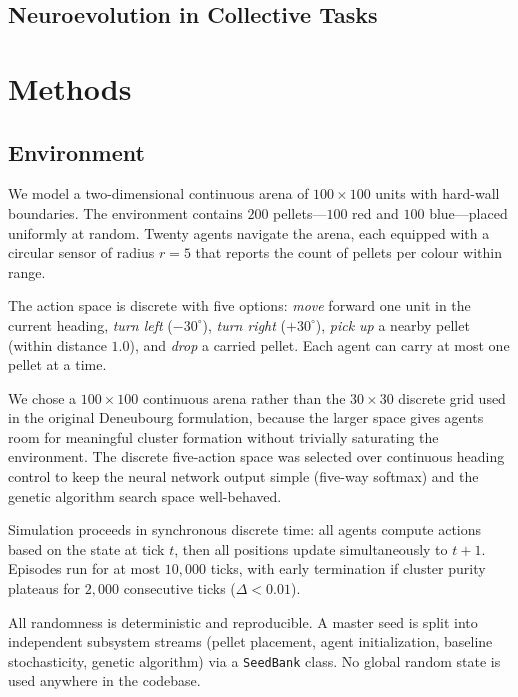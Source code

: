 \documentclass[11pt,a4paper]{article}
\begin{document}
\subsection{Neuroevolution in Collective Tasks}

\section{Methods}
\label{sec:methods}

\subsection{Environment}
\label{sec:methods:environment}

We model a two-dimensional continuous arena of $100 \times 100$ units with hard-wall boundaries. The environment contains $200$ pellets---$100$ red and $100$ blue---placed uniformly at random. Twenty agents navigate the arena, each equipped with a circular sensor of radius $r=5$ that reports the count of pellets per colour within range.

The action space is discrete with five options: \textit{move} forward one unit in the current heading, \textit{turn left} ($-30^\circ$), \textit{turn right} ($+30^\circ$), \textit{pick up} a nearby pellet (within distance $1.0$), and \textit{drop} a carried pellet. Each agent can carry at most one pellet at a time.

We chose a $100 \times 100$ continuous arena rather than the $30 \times 30$ discrete grid used in the original Deneubourg formulation, because the larger space gives agents room for meaningful cluster formation without trivially saturating the environment. The discrete five-action space was selected over continuous heading control to keep the neural network output simple (five-way softmax) and the genetic algorithm search space well-behaved.

Simulation proceeds in synchronous discrete time: all agents compute actions based on the state at tick $t$, then all positions update simultaneously to $t\!+\!1$. Episodes run for at most $10{,}000$ ticks, with early termination if cluster purity plateaus for $2{,}000$ consecutive ticks ($\Delta < 0.01$).

All randomness is deterministic and reproducible. A master seed is split into independent subsystem streams (pellet placement, agent initialization, baseline stochasticity, genetic algorithm) via a \texttt{SeedBank} class. No global random state is used anywhere in the codebase.
\end{document}
